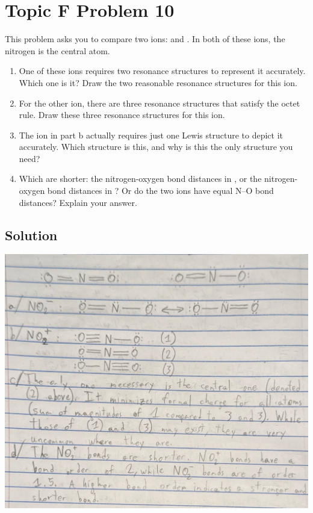\documentclass[10pt]{article}
\begin{document}
    \pagebreak
    \section{Topic F Problem 10}
        This problem asks you to compare two ions:  and . 
        In both of these ions, the nitrogen is the central atom.
        \begin{enumerate}[label=\alph*)]
            \item   One of these ions requires two resonance structures to represent it accurately. Which one is it? Draw the two reasonable resonance structures for this ion.
            \item   For the other ion, there are three resonance structures that satisfy the octet rule. Draw these three resonance structures for this ion.
            \item   The ion in part b actually requires just one Lewis structure to depict it accurately. Which structure is this, and why is this the only structure you need?
            \item   Which are shorter: the nitrogen-oxygen bond distances in , or the nitrogen-oxygen bond distances in ? Or do the two ions have equal N–O bond distances? Explain your answer.
        \end{enumerate}
        
        \subsection{Solution}
            \begin{center}
                \includegraphics[width=\textwidth]{Answers Images/F10.jpg}
            \end{center}
\end{document}
